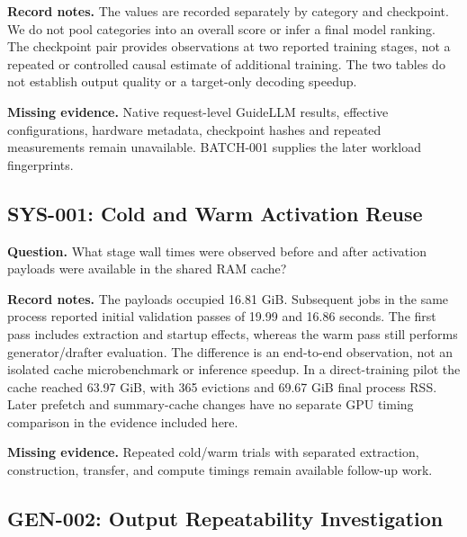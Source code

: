 

\textbf{Record notes.} The values are recorded separately by category and
checkpoint. We do not pool categories into an overall score or infer a final
model ranking. The checkpoint pair provides observations at two reported
training stages, not a repeated or controlled causal estimate of additional
training. The two tables do not establish output quality or a target-only
decoding speedup.

\textbf{Missing evidence.} Native request-level GuideLLM results, effective
configurations, hardware metadata, checkpoint hashes and repeated measurements
remain unavailable. BATCH-001 supplies the later workload fingerprints.

\subsection{SYS-001: Cold and Warm Activation Reuse}

\textbf{Question.} What stage wall times were observed before and after
activation payloads were available in the shared RAM cache?



\textbf{Record notes.} The payloads occupied 16.81 GiB. Subsequent jobs in the
same process reported initial validation passes of 19.99 and 16.86 seconds.
The first pass includes extraction and startup effects, whereas the warm pass
still performs generator/drafter evaluation. The difference is an end-to-end
observation, not an isolated cache microbenchmark or inference speedup. In a
direct-training pilot the cache reached 63.97 GiB, with 365 evictions and
69.67 GiB final process RSS. Later prefetch and summary-cache changes have no
separate GPU timing comparison in the evidence included here.

\textbf{Missing evidence.} Repeated cold/warm trials with separated extraction,
construction, transfer, and compute timings remain available follow-up work.

\subsection{GEN-002: Output Repeatability Investigation}


